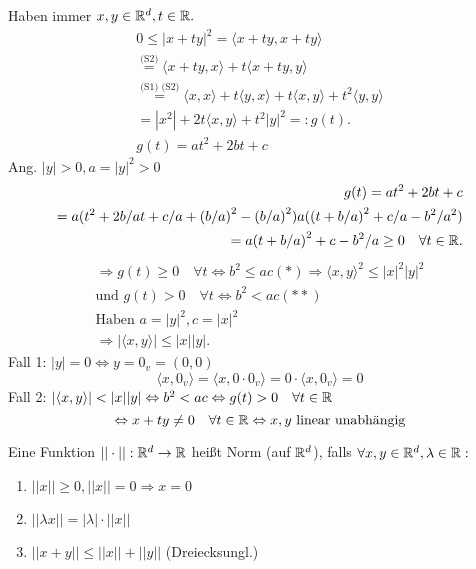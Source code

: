 \documentclass[../ana1.tex]{subfiles}
\begin{document}
\begin{bew}
	Haben immer \( x,y\in\mathbb{R}^d, t\in\mathbb{R}. \)
	\begin{align*}
		0\leq |x+ty|^2 = \langle x+ty, x+ty\rangle \\
		\overset{\text{(S2)}}{=} \langle x+ty,x\rangle + t\langle x+ty,y\rangle \\
		\overset{\text{(S1) (S2)}}{=} \langle x,x\rangle + t \langle y,x\rangle + t\langle x,y\rangle + t^2\langle y,y\rangle \\
		= |x^2| + 2t\langle x,y\rangle + t^2|y|^2 =: g(t).\\
		g(t) = at^2 + 2bt + c
	\end{align*}
	Ang. \(|y| > 0, a = |y|^2 > 0 \)
	\begin{align*}
		g(t) = at^2 + 2bt + c\\
		= a{(t^2 + 2b/a t + c/a + {(b/a)}^2 - {(b/a)}^2)} a{({(t+b/a)}^2 + c/a - b^2/a^2)}\\
		= a{(t+b/a)}^2 + c - b^2/a \geq 0 \quad\forall t\in\mathbb{R}.
	\end{align*}
	\begin{align*}
		\Rightarrow g(t) \geq 0 \quad\forall t \Leftrightarrow b^2 \leq ac (*) \Rightarrow \langle x,y\rangle^2 \leq |x|^2|y|^2\\
		\text{und }g(t) > 0 \quad\forall t \Leftrightarrow b^2 < ac (**)\\
		\text{Haben }  a=|y|^2, c=|x|^2\\
		\Rightarrow |\langle x,y\rangle|\leq |x||y|.
	\end{align*}
	Fall 1: \(|y| = 0 \Leftrightarrow y = 0_v = (0, 0)\)
	\[\langle x, 0_v\rangle = \langle x, 0 \cdot 0_v\rangle = 0 \cdot \langle x, 0_v\rangle = 0\]
	Fall 2: \(|\langle x, y\rangle| < |x||y| \Leftrightarrow b^2 < ac \Leftrightarrow g(t) > 0 \quad \forall t \in \mathbb{R} \) \\
	\[\Leftrightarrow x + ty \neq 0 \quad \forall t \in \mathbb{R} \Leftrightarrow x, y \text{ linear unabhängig} \]
\end{bew}
\begin{defi}
	Eine Funktion \( ||\cdot || : \mathbb{R}^d \rightarrow \mathbb{R} \) heißt Norm (auf \( \mathbb{R}^d \)), falls \( \forall x,y\in\mathbb{R}^d, \lambda\in\mathbb{R}: \)
	\begin{enumerate}
		\item \( ||x||\geq 0, ||x|| = 0 \Rightarrow x = 0 \)
		\item \( ||\lambda x|| = |\lambda|\cdot||x|| \)
		\item \( ||x+y|| \leq ||x|| + ||y|| \) (Dreiecksungl.)
	\end{enumerate}
\end{defi}
\end{document}
